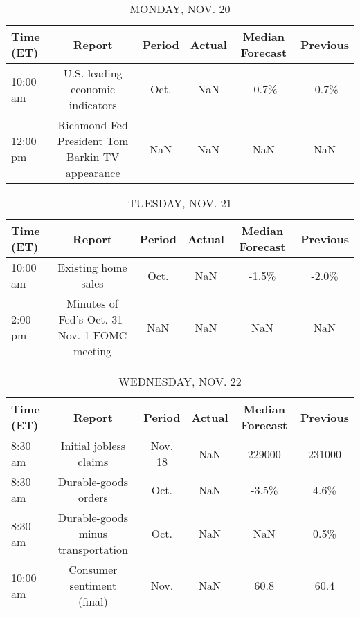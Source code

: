 \documentclass{article}%
\begin{document}
%
\normalsize%


\begin{table}[htbp]%
\caption{MONDAY, NOV. 20}%
\centering%
\begin{adjustbox}{width=1\textwidth}%
\begin{tabular}{lccccc}
\toprule
Time (ET) &                                          Report & Period & Actual & Median Forecast & Previous \\
\midrule
 10:00 am &                U.S. leading economic indicators &   Oct. &    NaN &           -0.7\% &    -0.7\% \\
 12:00 pm & Richmond Fed President Tom Barkin TV appearance &    NaN &    NaN &             NaN &      NaN \\
\bottomrule
\end{tabular}
%
\end{adjustbox}%
\end{table}

%


\begin{table}[htbp]%
\caption{TUESDAY, NOV. 21}%
\centering%
\begin{adjustbox}{width=1\textwidth}%
\begin{tabular}{lccccc}
\toprule
Time (ET) &                                       Report & Period & Actual & Median Forecast & Previous \\
\midrule
 10:00 am &                          Existing home sales &   Oct. &    NaN &           -1.5\% &    -2.0\% \\
  2:00 pm & Minutes of Fed's Oct. 31-Nov. 1 FOMC meeting &    NaN &    NaN &             NaN &      NaN \\
\bottomrule
\end{tabular}
%
\end{adjustbox}%
\end{table}

%


\begin{table}[htbp]%
\caption{WEDNESDAY, NOV. 22}%
\centering%
\begin{adjustbox}{width=1\textwidth}%
\begin{tabular}{lccccc}
\toprule
Time (ET) &                             Report &  Period & Actual & Median Forecast & Previous \\
\midrule
  8:30 am &             Initial jobless claims & Nov. 18 &    NaN &          229000 &   231000 \\
  8:30 am &               Durable-goods orders &    Oct. &    NaN &           -3.5\% &     4.6\% \\
  8:30 am & Durable-goods minus transportation &    Oct. &    NaN &             NaN &     0.5\% \\
 10:00 am &         Consumer sentiment (final) &    Nov. &    NaN &            60.8 &     60.4 \\
\bottomrule
\end{tabular}
%
\end{adjustbox}%
\end{table}
\end{document}

